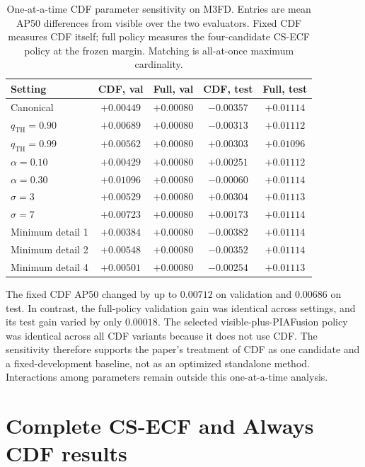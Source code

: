 \documentclass[11pt]{article}
\begin{document}
\begin{table}[ht]
\centering
\small
\setlength{\tabcolsep}{3pt}
\caption{One-at-a-time CDF parameter sensitivity on M3FD. Entries are mean
AP50 differences from visible over the two evaluators. Fixed CDF measures CDF
itself; full policy measures the four-candidate CS-ECF policy at the frozen
margin. Matching is all-at-once maximum cardinality.}
\label{tab:cdf-sensitivity}
\begin{tabular}{@{}lcccc@{}}
\toprule
Setting & CDF, val & Full, val & CDF, test & Full, test \\
\midrule
Canonical & \(+0.00449\) & \(+0.00080\) &
\(-0.00357\) & \(+0.01114\) \\
\(q_{\mathrm{TH}}=0.90\) & \(+0.00689\) & \(+0.00080\) &
\(-0.00313\) & \(+0.01112\) \\
\(q_{\mathrm{TH}}=0.99\) & \(+0.00562\) & \(+0.00080\) &
\(+0.00303\) & \(+0.01096\) \\
\(\alpha=0.10\) & \(+0.00429\) & \(+0.00080\) &
\(+0.00251\) & \(+0.01112\) \\
\(\alpha=0.30\) & \(+0.01096\) & \(+0.00080\) &
\(-0.00060\) & \(+0.01114\) \\
\(\sigma=3\) & \(+0.00529\) & \(+0.00080\) &
\(+0.00304\) & \(+0.01113\) \\
\(\sigma=7\) & \(+0.00723\) & \(+0.00080\) &
\(+0.00173\) & \(+0.01114\) \\
Minimum detail 1 & \(+0.00384\) & \(+0.00080\) &
\(-0.00382\) & \(+0.01114\) \\
Minimum detail 2 & \(+0.00548\) & \(+0.00080\) &
\(-0.00352\) & \(+0.01114\) \\
Minimum detail 4 & \(+0.00501\) & \(+0.00080\) &
\(-0.00254\) & \(+0.01113\) \\
\bottomrule
\end{tabular}
\end{table}

The fixed CDF AP50 changed by up to \(0.00712\) on validation and
\(0.00686\) on test. In contrast, the full-policy validation gain was
identical across settings, and its test gain varied by only \(0.00018\).
The selected visible-plus-PIAFusion policy was identical across all CDF
variants because it does not use CDF. The sensitivity therefore supports the
paper's treatment of CDF as one candidate and a fixed-development baseline,
not as an optimized standalone method. Interactions among parameters remain
outside this one-at-a-time analysis.

\section{Complete CS-ECF and Always CDF results}
\end{document}
